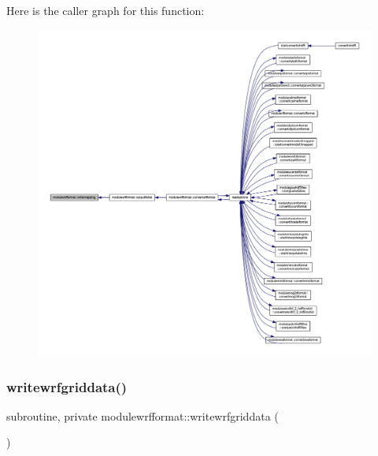 Here is the caller graph for this function\+:\nopagebreak
\begin{figure}[H]
\begin{center}
\leavevmode
\includegraphics[width=350pt]{namespacemodulewrfformat_a2d9d50bc96864ebc8514152b797f5465_icgraph}
\end{center}
\end{figure}
\mbox{\label{namespacemodulewrfformat_ac70c0a00b2fe8eb641ec2a6846ed4363}} 
\subsubsection{\texorpdfstring{writewrfgriddata()}{writewrfgriddata()}}
{\footnotesize\ttfamily subroutine, private modulewrfformat\+::writewrfgriddata (\begin{DoxyParamCaption}{ }\end{DoxyParamCaption})\hspace{0.3cm}{\ttfamily [private]}}

